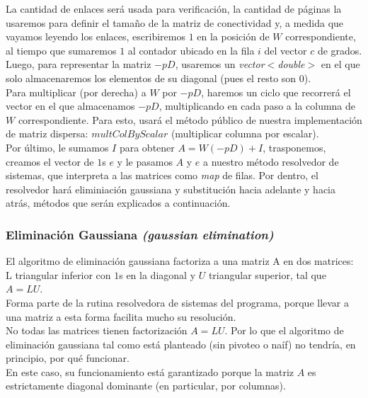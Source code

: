 		La cantidad de enlaces será usada para verificación, la cantidad de páginas la usaremos para definir el tamaño de la matriz de conectividad y, a medida que vayamos leyendo los enlaces, escribiremos $1$ en la posición de $W$ correspondiente, al tiempo que sumaremos $1$ al contador ubicado en la fila $i$ del vector $c$ de grados. \\

		Luego, para representar la matriz $-pD$, usaremos un \textit{vector$<$double$>$} en el que solo almacenaremos los elementos de su diagonal (pues el resto son $0$). \\

		Para multiplicar (por derecha) a $W$ por $-pD$, haremos un ciclo que recorrerá el vector en el que almacenamos $-pD$, multiplicando en cada paso a la columna de $W$ correspondiente. Para esto, usará el método público de nuestra implementación de matriz dispersa: $multColByScalar$ (multiplicar columna por escalar). \\

		Por último, le sumamos $I$ para obtener $A = W(-pD) + I$, trasponemos, creamos el vector de $1$s $e$ y le pasamos $A$ y $e$ a nuestro método resolvedor de sistemas, que interpreta a las matrices como \textit{map} de filas. Por dentro, el resolvedor hará eliminiación gaussiana y substitución hacia adelante y hacia atrás, métodos que serán explicados a continuación. \\

		\subsubsection{Eliminación Gaussiana \textit{(gaussian elimination)}}

			El algoritmo de eliminación gaussiana factoriza a una matriz A en dos matrices: L triangular inferior con $1$s en la diagonal y $U$ triangular superior, tal que $A = LU$. \\

			Forma parte de la rutina resolvedora de sistemas del programa, porque llevar a una matriz a esta forma facilita mucho su resolución. \\

			No todas las matrices tienen factorización $A=LU$. Por lo que el algoritmo de eliminación gaussiana tal como está planteado (sin pivoteo o naíf) no tendría, en principio, por qué funcionar. \\

			En este caso, su funcionamiento está garantizado porque la matriz $A$ es estrictamente diagonal dominante (en particular, por columnas). \\

